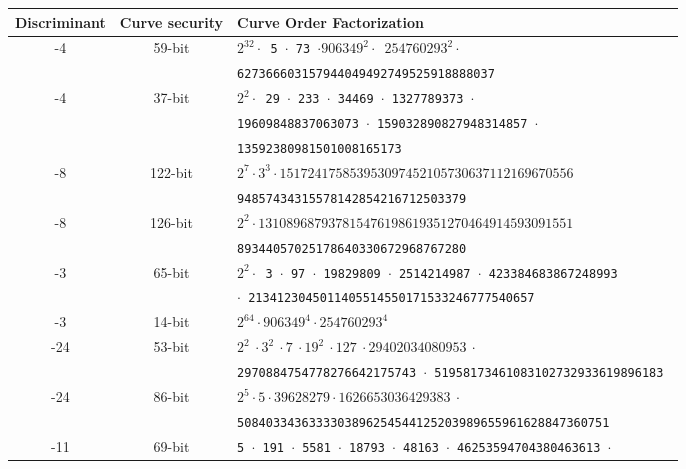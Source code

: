 \documentclass{amsart}
\begin{document}
\begin{table*}[ht]
    \centering\footnotesize
    \begin{tabularx}{\textwidth}{ccl}
        \toprule
                            
        \textbf{Discriminant}    & \textbf{Curve security}  & \textbf{Curve Order Factorization} \\
        \midrule
        -4  &  59-bit & \tt $2^{32} \cdot$ 5 $\cdot$  73 $\cdot 906349^{2} \cdot$ $254760293^{2} \cdot$ \\
                              	&   & \tt  627366603157944049492749525918888037 \\
        -4  &  37-bit & \tt $2^{2} \cdot$ 29 $\cdot$ 233 $\cdot$ 34469 $\cdot$ 1327789373 $\cdot$  \\
         			&   & \tt  19609848837063073 $\cdot$ 159032890827948314857 $\cdot$  \\
                              	&   & \tt  13592380981501008165173 \\
        -8  &  122-bit & \tt $2^{7} \cdot 3^{3} \cdot 151724175853953097452105730637112169670556$ \\
                              	&   & \tt   94857434315578142854216712503379 \\
        -8  &  126-bit & \tt $2^{2} \cdot 131089687937815476198619351270464914593091551$  \\
                              	&   & \tt  89344057025178640330672968767280 \\                              
        -3  &   65-bit & \tt $2^{2} \cdot$ 3 $\cdot$ 97 $\cdot$ 19829809 $\cdot$ 2514214987 $\cdot$ 423384683867248993 \\
                              	&   & \tt  $\cdot$ 2134123045011405514550171533246777540657  \\
        -3  &  14-bit & \tt $2^{64} \cdot 906349^{4} \cdot 254760293^{4}$  \\
        -24  &  53-bit & \tt $2^2 ~ \cdot 3^2 ~ \cdot 7 ~ \cdot 19^2 ~ \cdot 127 ~ \cdot 29402034080953  ~ \cdot $  \\
         			&   & \tt  2970884754778276642175743  $\cdot$ 51958173461083102732933619896183  \\    
        -24  &  86-bit & \tt $2^5 \cdot 5 \cdot 39628279 \cdot 1626653036429383 ~ \cdot$  \\
         			&   & \tt  5084033436333303896254544125203989655961628847360751  \\    
        -11  &  69-bit & \tt 5 $\cdot$ 191 $\cdot$ 5581 $\cdot$ 18793 $\cdot$ 48163 $\cdot$ 46253594704380463613 $\cdot$  \\

\end{tabularx}
\end{table*}
\end{document}
